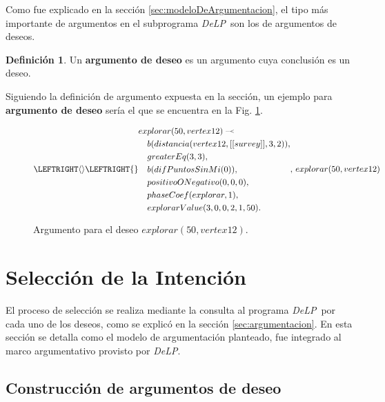 \documentclass[oneside]{book}
\theoremstyle{definition}
\newtheorem{definicion}{Definición}[section]
\newcommand{\DLP}{\mbox{\textit{DeLP}}}
\newcommand{\defleftarrow}{{\raise1.5pt\hbox{\tiny\defleft}}}
\newcommand{\defleft}{\mbox{---\hspace{-1.5pt}\raise.05pt\hbox{$<$}}}
\begin{document}
Como fue explicado en la sección \ref{sec:modeloDeArgumentacion}, el tipo más importante de 
argumentos en el subprograma \DLP\ son los de argumentos de deseos. 

\begin{definicion}
	Un \textbf{argumento de deseo} es un argumento cuya conclusión es un deseo.
\end{definicion}

Siguiendo la definición de argumento expuesta en la sección, un ejemplo para
\textbf{argumento de deseo} sería el que se encuentra en la Fig. 
\ref{fig:ejemploArgDeseo}.

\begin{figure}[h]

\begin{equation*}
\LEFTRIGHT\langle\rangle{
\LEFTRIGHT\{\}{
\begin{aligned}
ex&plorar(50, vertex12)\; \defleftarrow \; \\
    &b(distancia(vertex12, [[survey]], 3, 2)), \\
    &greaterEq(3, 3),\\
    &b(difPuntosSinMi(0)),\\
    &positivoONegativo(0, 0, 0),\\
    &phaseCoef(explorar, 1),\\
    &explorarValue(3, 0, 0, 2, 1, 50).
\end{aligned}
}
,\, explorar(50, vertex12) 
}
\end{equation*}



\caption{Argumento para el deseo $explorar(50, vertex12)$.}
\label{fig:ejemploArgDeseo}
\end{figure}

\section{Selección de la Intención}

El proceso de selección se realiza mediante la consulta al programa \DLP\ por cada
uno de los deseos, como se explicó en la sección \ref{sec:argumentacion}. 
En esta sección se detalla como el modelo de argumentación planteado, fue integrado al marco
argumentativo provisto por \DLP.

\subsection{Construcción de argumentos de deseo}
\end{document}
